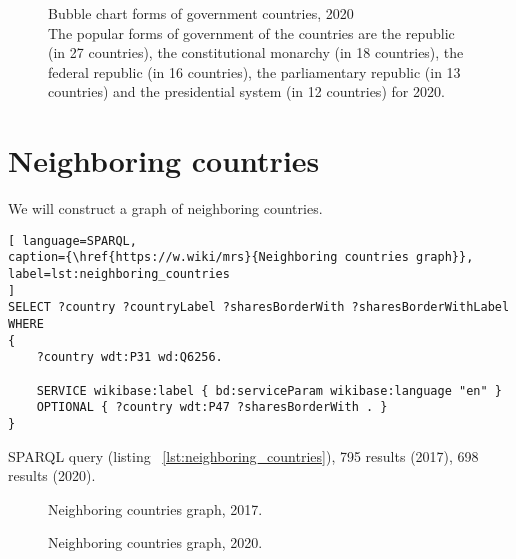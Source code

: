 \begin{figure}
	{
		\setlength{\fboxsep}{0pt}%
		\setlength{\fboxrule}{1pt}%
	}
	\caption{Bubble chart forms of government countries, 2020
	\\ 
	The popular forms of government of the countries are the republic (in 27 countries), the constitutional monarchy (in 18 countries), the federal republic (in 16 countries), the parliamentary republic (in 13 countries) and the presidential system (in 12 countries) for 2020.
}%
	\label{fig:bubble_chart_forms_of_government_countries_2020}%
\end{figure}

\section{Neighboring countries}

We will construct a graph of neighboring countries.

\begin{lstlisting}[ language=SPARQL, 
caption={\href{https://w.wiki/mrs}{Neighboring countries graph}},
label=lst:neighboring_countries
]
SELECT ?country ?countryLabel ?sharesBorderWith ?sharesBorderWithLabel
WHERE
{
	?country wdt:P31 wd:Q6256.
	
	SERVICE wikibase:label { bd:serviceParam wikibase:language "en" }
	OPTIONAL { ?country wdt:P47 ?sharesBorderWith . }
}
\end{lstlisting}

SPARQL query (listing ~\ref{lst:neighboring_countries}), 795 results (2017), 698 results (2020).

\begin{figure}
	{
		\setlength{\fboxsep}{0pt}%
		\setlength{\fboxrule}{1pt}%
	}
	\caption{Neighboring countries graph, 2017.
	}%
	\label{fig:neighboring_countries_2017}%
\end{figure}

\begin{figure}
	{
		\setlength{\fboxsep}{0pt}%
		\setlength{\fboxrule}{1pt}%
	}
	\caption{Neighboring countries graph, 2020.
	}%
	\label{fig:neighboring_countries_2020}%
\end{figure}

